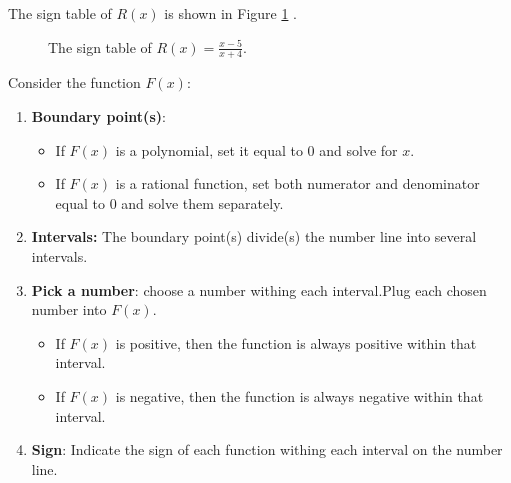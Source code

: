 The sign table of $R(x)$ is shown in Figure \ref{fig:ST_ex2} .
\begin{figure}[ht]   
    \centering
    \caption{The sign table of $R(x)=\frac{x-5}{x+4}$.}
    \label{fig:ST_ex2}
\end{figure}
\begin{tcolorbox}[title=Creating a sign table, 
                  fonttitle=\bfseries,
                  colframe=blue!75!black,
                  colback=blue!5!white]
Consider the function $F(x)$:
\begin{enumerate}[1.]
    \item \textbf{Boundary point(s)}: 
    \begin{itemize}
        \item If $F(x)$ is a polynomial, set it equal to 0 and solve for $x$.
        \item If $F(x)$ is a rational function, set both numerator and denominator equal to 0 and solve them separately. 
    \end{itemize}
    \item \textbf{Intervals:} The boundary point(s) divide(s) the number line into several intervals.
    \item \textbf{Pick a number}: choose a number withing each interval.Plug each chosen number into $F(x)$. 
    \begin{itemize}
        \item If $F(x)$ is positive, then the function is always positive within that interval.
        \item If $F(x)$ is negative, then the function is always negative within that interval.
    \end{itemize}
    \item \textbf{Sign}: Indicate the sign of each function withing each interval on the number line.
\end{enumerate}
\end{tcolorbox}
